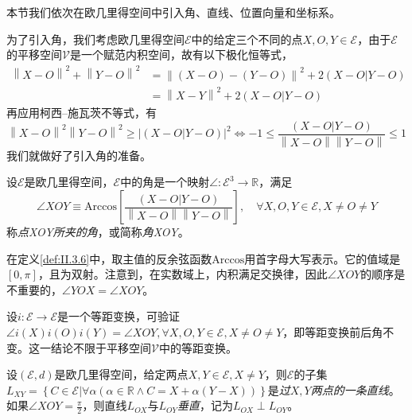 \documentclass[../main.tex]{subfiles}
\begin{document}
本节我们依次在欧几里得空间中引入角、直线、位置向量和坐标系。

为了引入角，我们考虑欧几里得空间$\mathcal{E}$中的给定三个不同的点$X,O,Y\in\mathcal{E}$，由于$\mathcal{E}$的平移空间$\mathcal{V}$是一个赋范内积空间，故有以下极化恒等式，
\begin{align*}
    \left\|X-O\right\|^2+\left\|Y-O\right\|^2 & =\left\|\left(X-O\right)-\left(Y-O\right)\right\|^2+2\left(X-O|Y-O\right) \\
                                              & =\left\|X-Y\right\|^2+2\left(X-O|Y-O\right)
\end{align*}
再应用柯西--施瓦茨不等式，有
\[\left\|X-O\right\|^2\left\|Y-O\right\|^2\geq\left|\left(X-O|Y-O\right)\right|^2\Leftrightarrow-1\leq\frac{\left(X-O|Y-O\right)}{\left\|X-O\right\|\left\|Y-O\right\|}\leq1\]
我们就做好了引入角的准备。

\begin{definition}[角]\label{def:II.3.6}
    设$\mathcal{E}$是欧几里得空间，$\mathcal{E}$中的角是一个映射$\angle:\mathcal{E}^3\rightarrow\mathbb{R}$，满足
    \[\angle XOY\equiv\mathrm{Arccos}\left[\frac{\left(X-O|Y-O\right)}{\left\|X-O\right\|\left\|Y-O\right\|}\right],\quad\forall X,O,Y\in\mathcal{E},X\neq O\neq Y\]
    称\emph{点XOY所夹的角}，或简称\emph{角XOY}。
\end{definition}

在定义\ref{def:II.3.6}中，取主值的反余弦函数$\mathrm{Arccos}$用首字母大写表示。它的值域是$\left[0,\pi\right]$，且为双射。注意到，在实数域上，内积满足交换律，因此$\angle XOY$的顺序是不重要的，$\angle YOX=\angle XOY$。


设$i:\mathcal{E}\rightarrow\mathcal{E}$是一个等距变换，可验证$\angle i\left(X\right)i\left(O\right)i\left(Y\right)=\angle XOY,\forall X,O,Y\in\mathcal{E},X\neq O\neq Y$，即等距变换前后角不变。这一结论不限于平移空间$\mathcal{V}$中的等距变换。

\begin{definition}[过两点的直线]\label{def:II.3.7}
    设$\left(\mathcal{E},d\right)$是欧几里得空间，给定两点$X,Y\in\mathcal{E},X\neq Y$，则$\mathcal{E}$的子集$L_{XY}=\left\{C\in\mathcal{E}|\forall \alpha\left(\alpha\in\mathbb{R}\wedge C=X+\alpha\left(Y-X\right)\right)\right\}$是\emph{过}$X,Y$\emph{两点的一条直线}。如果$\angle XOY=\frac{\pi}{2}$，则直线$L_{OX}$与$L_{OY}$\emph{垂直}，记为$L_{OX}\perp L_{OY}$。
\end{definition}
\end{document}
